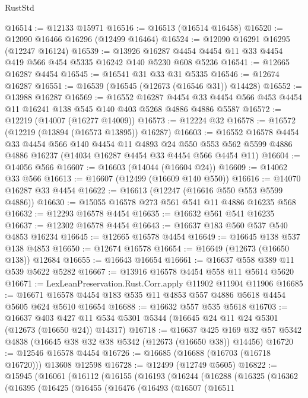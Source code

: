 \begin{lexlean}{RustStd}
\begin{coremodule}
@16514 := @12133 @15971
@16516 := @16513 (@16514 @16458)
@16520 := @12090 @16466 @16296 (@12499 @16464)
@16524 := @12090 @16291 @16295 (@12247 @16124)
@16539 := @13926 @16287 @4454 @4454 @11 @33 @4454 @419 @566 @454 @5335 @16242 @140 @5230 @608 @5236
@16541 := @12665 @16287 @4454
@16545 := @16541 @31 @33 @31 @5335
@16546 := @12674 @16287
@16551 := @16539 (@16545 (@12673 (@16546 @31)) @14428)
@16552 := @13988 @16287
@16569 := @16552
    @16287
    @4454
    @33
    @4454
    @566
    @453
    @4454
    @11
    @16241
    @138
    @545
    @140
    @403
    @5268
    @4886
    @4886
    @5587
@16572 := @12219 (@14007 (@16277 @14009))
@16573 := @12224 @32
@16578 := @16572 (@12219 (@13894 (@16573 @13895)) @16287)
@16603 := @16552
    @16578
    @4454
    @33
    @4454
    @566
    @140
    @4454
    @11
    @4893
    @24
    @550
    @553
    @562
    @5599
    @4886
    @4886
    @16237
    (@14034 @16287 @4454 @33 @4454 @566 @4454 @11)
@16604 := @14056 @566
@16607 := @16603 (@14044 (@16604 @24))
@16609 := @14062 @33 @566
@16613 := @16607 (@12499 (@16609 @140 @550))
@16616 := @14070 @16287 @33 @4454
@16622 := @16613 (@12247 (@16616 @550 @553 @5599 @4886))
@16630 := @15055 @16578 @273 @561 @541 @11 @4886 @16235 @568
@16632 := @12293 @16578 @4454
@16635 := @16632 @561 @541 @16235
@16637 := @12302 @16578 @4454
@16643 := @16637 @183 @560 @537 @540 @4853 @16234
@16645 := @12665 @16578 @4454
@16649 := @16645 @138 @537 @138 @4853
@16650 := @12674 @16578
@16654 := @16649 (@12673 (@16650 @138)) @12684
@16655 := @16643 @16654
@16661 := @16637 @558 @389 @11 @539 @5622 @5282
@16667 := @13916 @16578 @4454 @558 @11 @5614 @5620
@16671 := LexLeanPreservation.Rust.Corr.apply @11902 @11904 @11906
@16685 := @16671 @16578 @4454 @183 @535 @11 @4853 @557 @4886 @5618 @4454 @5605 @624 @5610 @16654
@16688 := @16632 @557 @535 @5618
@16703 := @16637
    @403
    @427
    @11
    @534
    @5301
    @5344
    (@16645 @24 @11 @24 @5301 (@12673 (@16650 @24)) @14317)
@16718 := @16637
    @425
    @169
    @32
    @57
    @5342
    @4838
    (@16645 @38 @32 @38 @5342 (@12673 (@16650 @38)) @14456)
@16720 := @12546 @16578 @4454
@16726 := @16685 (@16688 (@16703 (@16718 @16720))) @13608 @12598
@16728 := @12499 (@12749 @5605)
@16822 := @15945
    (@16061
      (@16112
        (@16155
          (@16193
            (@16244
              (@16288
                (@16325
                  (@16362
                    (@16395
                      (@16425
                        (@16455
                          (@16476
                            (@16493
                              (@16507
                                (@16511

\end{coremodule}
\end{lexlean}
